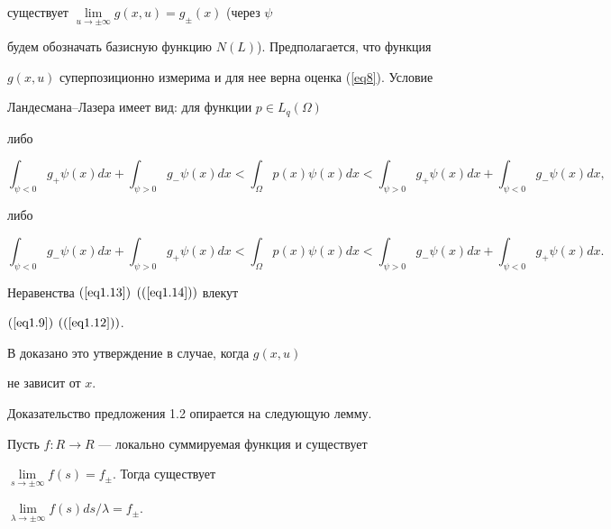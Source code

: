 существует $\lim\limits_{u\to \pm \infty }g(x,u)=g_{\pm}(x)$ (через $\psi$


будем обозначать базисную функцию $N(L)$). Предполагается, что функция


$g(x,u)$ суперпозиционно измерима и для нее верна оценка (\ref{eq8}). Условие


Ландесмана--Лазера имеет вид: для функции $p\in L_q(\Omega )$


либо


\begin{equation}


\int_{\psi <0}g_{+}\psi (x)dx+ \int_{\psi >0}g_{-}


\psi (x)dx< \int_{\Omega }p(x)\psi (x)dx<\int_{\psi >0}g_{+}


\psi (x)dx+ \int_{\psi <0}g_{-}\psi (x)dx,


\label{eq1.13}


\end{equation}


либо


\begin{equation}


\int_{\psi <0}g_{-}\psi (x)dx+\int_{\psi >0}g_{+}\psi


(x)dx<\int_{\Omega }p(x)\psi (x)dx<\int_{\psi >0}g_{-}\psi (x)


dx+\int_{\psi <0}g_{+}\psi (x)dx.


\label{eq1.14}


\end{equation}





\begin{props}


Неравенства $(\ref{eq1.13})$ $((\ref{eq1.14}))$ влекут


$(\ref{eq1.9})$ $((\ref{eq1.12}))$.


\end{props}





В \cite{n19} доказано это утверждение в случае, когда $g(x,u)$


не зависит от $x$.





Доказательство предложения 1.2 опирается на следующую лемму.





\begin{lems}


Пусть $f:R\to R$ --- локально суммируемая функция и существует


$\lim\limits_{s\to \pm \infty } f(s)=f_{\pm}$. Тогда существует


$\lim\limits_{\lambda \to \pm \infty }f(s)ds/\lambda =f_{\pm }$.


\end{lems}





